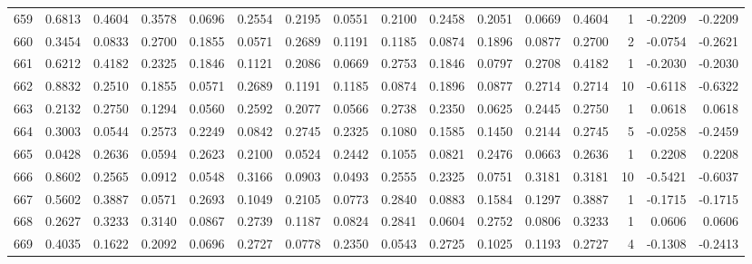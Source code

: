 \begin{tabular}{lrrrrrrrrrrrrrrr}
659 &      0.6813 &  0.4604 &  0.3578 &  0.0696 &  0.2554 &  0.2195 &  0.0551 &  0.2100 &  0.2458 &  0.2051 &   0.0669 &     0.4604 &      1 &                   -0.2209 &                    -0.2209 \\
660 &      0.3454 &  0.0833 &  0.2700 &  0.1855 &  0.0571 &  0.2689 &  0.1191 &  0.1185 &  0.0874 &  0.1896 &   0.0877 &     0.2700 &      2 &                   -0.0754 &                    -0.2621 \\
661 &      0.6212 &  0.4182 &  0.2325 &  0.1846 &  0.1121 &  0.2086 &  0.0669 &  0.2753 &  0.1846 &  0.0797 &   0.2708 &     0.4182 &      1 &                   -0.2030 &                    -0.2030 \\
662 &      0.8832 &  0.2510 &  0.1855 &  0.0571 &  0.2689 &  0.1191 &  0.1185 &  0.0874 &  0.1896 &  0.0877 &   0.2714 &     0.2714 &     10 &                   -0.6118 &                    -0.6322 \\
663 &      0.2132 &  0.2750 &  0.1294 &  0.0560 &  0.2592 &  0.2077 &  0.0566 &  0.2738 &  0.2350 &  0.0625 &   0.2445 &     0.2750 &      1 &                    0.0618 &                     0.0618 \\
664 &      0.3003 &  0.0544 &  0.2573 &  0.2249 &  0.0842 &  0.2745 &  0.2325 &  0.1080 &  0.1585 &  0.1450 &   0.2144 &     0.2745 &      5 &                   -0.0258 &                    -0.2459 \\
665 &      0.0428 &  0.2636 &  0.0594 &  0.2623 &  0.2100 &  0.0524 &  0.2442 &  0.1055 &  0.0821 &  0.2476 &   0.0663 &     0.2636 &      1 &                    0.2208 &                     0.2208 \\
666 &      0.8602 &  0.2565 &  0.0912 &  0.0548 &  0.3166 &  0.0903 &  0.0493 &  0.2555 &  0.2325 &  0.0751 &   0.3181 &     0.3181 &     10 &                   -0.5421 &                    -0.6037 \\
667 &      0.5602 &  0.3887 &  0.0571 &  0.2693 &  0.1049 &  0.2105 &  0.0773 &  0.2840 &  0.0883 &  0.1584 &   0.1297 &     0.3887 &      1 &                   -0.1715 &                    -0.1715 \\
668 &      0.2627 &  0.3233 &  0.3140 &  0.0867 &  0.2739 &  0.1187 &  0.0824 &  0.2841 &  0.0604 &  0.2752 &   0.0806 &     0.3233 &      1 &                    0.0606 &                     0.0606 \\
669 &      0.4035 &  0.1622 &  0.2092 &  0.0696 &  0.2727 &  0.0778 &  0.2350 &  0.0543 &  0.2725 &  0.1025 &   0.1193 &     0.2727 &      4 &                   -0.1308 &                    -0.2413 \\

\end{tabular}
